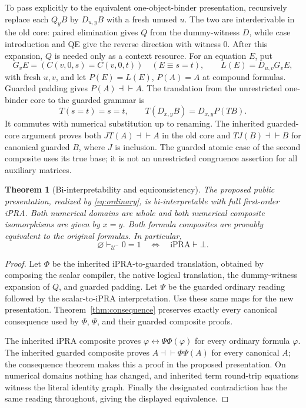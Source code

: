 \documentclass[11pt,letterpaper]{article}
\newtheorem{theorem}{Theorem}[section]
\theoremstyle{definition}
\newcommand{\IPRA}{\mathrm{iPRA}}
\newcommand{\UU}{\mathcal U^{-}}
\begin{document}
To pass explicitly to the equivalent one-object-binder presentation,
recursively replace each $Q_yB$ by $D_{u,y}B$ with a fresh unused $u$.
The two are interderivable in the old core: paired elimination gives $Q$
from the dummy-witness $D$, while case introduction and QE give the reverse
direction with witness $0$. After this expansion, $Q$ is needed only as a
context resource. For an equation $E$, put
\[
 G_vE=(C(v,0,s)=C(v,0,t))\quad(E\equiv s=t),\qquad
 L(E)=D_{u,v}G_vE,
\]
with fresh $u,v$, and let $P(E)=L(E)$, $P(A)=A$ at compound formulas.
Guarded padding gives $P(A)\dashv\vdash A$. The translation from the
unrestricted one-binder core to the guarded grammar is
\[
 T(s=t)=s=t,\qquad T(D_{x,y}B)=D_{x,y}P(TB).
\]
It commutes with numerical substitution up to renaming. The inherited
guarded-core argument proves both $JT(A)\dashv\vdash A$ in the old core
and $TJ(B)\dashv\vdash B$ for canonical guarded $B$, where $J$ is inclusion.
The guarded atomic case of the second composite uses its true base; it is
not an unrestricted congruence assertion for all auxiliary matrices.

\begin{theorem}[Bi-interpretability and equiconsistency]
\label{thm:biinterp}
The proposed public presentation, realized by \eqref{eq:ordinary}, is
bi-interpretable with full first-order iPRA. Both numerical domains are
whole and both numerical composite isomorphisms are given by $x=y$.
Both formula composites are provably equivalent to the original formulas.
In particular,
\[
 \varnothing\vdash_{\UU}0=1
 \quad\Longleftrightarrow\quad
 \IPRA\vdash\bot.
\]
\end{theorem}
\begin{proof}
Let $\Phi$ be the inherited iPRA-to-guarded translation, obtained by
composing the scalar compiler, the native logical translation, the
dummy-witness expansion of $Q$, and guarded padding. Let $\Psi$ be the
guarded ordinary reading followed by the
scalar-to-iPRA interpretation. Use these same maps for the new presentation.
Theorem~\ref{thm:consequence} preserves exactly every canonical consequence
used by $\Phi$, $\Psi$, and their guarded composite proofs.

The inherited iPRA composite proves
$\varphi\leftrightarrow\Psi\Phi(\varphi)$ for every ordinary formula
$\varphi$. The inherited guarded composite proves
$A\dashv\vdash\Phi\Psi(A)$ for every canonical $A$; the consequence
theorem makes this a proof in the proposed presentation. On numerical
domains nothing has changed, and inherited term round-trip equations
witness the literal identity graph. Finally the designated contradiction
has the same reading throughout, giving the displayed equivalence.
\end{proof}
\end{document}
